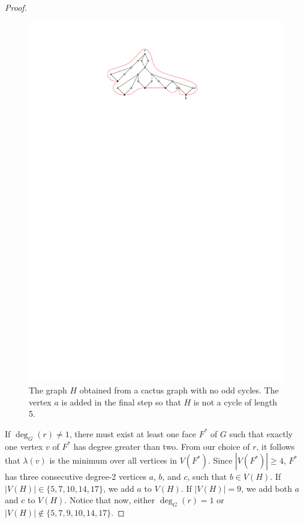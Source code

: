 \documentclass{patmorin}
\begin{document}
\begin{proof}
 \begin{figure}
    \begin{center}
        \includegraphics{figs/cactus}
    \end{center}
    \caption{The graph $H$ obtained from a cactus graph with no odd cycles.
        The vertex $a$ is added in the final step so that $H$ is not a cycle
        of length 5.}
 \end{figure}

If $\deg_G(r)\ne 1$, there must exist at least one face $F^*$ of $G$ such
that exactly one vertex $v$ of $F^*$ has degree greater than two. From
our choice of $r$, it follows that $\lambda(v)$ is the minimum over all
vertices in $V(F^*)$.  Since $|V(F^*)|\ge 4$, $F^*$ has three consecutive
degree-2 vertices $a$, $b$, and $c$, such that $b\in V(H)$. If $|V(H)|\in
\{5,7,10,14,17\}$, we add $a$ to $V(H)$. If $|V(H)|=9$, we add both $a$
and $c$ to $V(H)$. Notice that now, either $\deg_G(r)=1$ or $|V(H)|\notin
\{5,7,9,10,14,17\}$.


\end{proof}
\end{document}
